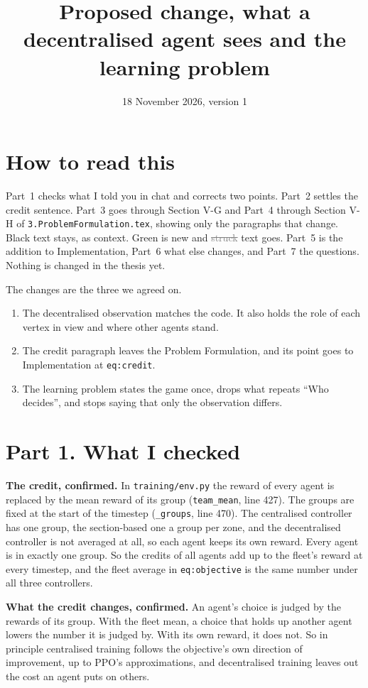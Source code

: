 \documentclass[11pt,a4paper]{article}
\title{Proposed change, what a decentralised agent sees and the learning problem}
\date{18 November 2026, version 1}
\newcommand{\new}[1]{\textcolor{newc}{#1}}
\newcommand{\old}[1]{\textcolor{gray}{\sout{#1}}}
\begin{document}
\sloppy
\maketitle

\section*{How to read this}
Part~1 checks what I told you in chat and corrects two points. Part~2
settles the credit sentence. Part~3 goes through Section V-G and Part~4
through Section V-H of \texttt{3.ProblemFormulation.tex}, showing only the
paragraphs that change. Black text stays, as context. \new{Green} is new
and \old{struck} text goes. Part~5 is the addition to Implementation, Part~6
what else changes, and Part~7 the questions. Nothing is changed in the
thesis yet.

The changes are the three we agreed on.
\begin{enumerate}[nosep]
  \item The decentralised observation matches the code. It also holds the
        role of each vertex in view and where other agents stand.
  \item The credit paragraph leaves the Problem Formulation, and its point
        goes to Implementation at \texttt{eq:credit}.
  \item The learning problem states the game once, drops what repeats
        ``Who decides'', and stops saying that only the observation differs.
\end{enumerate}

\section*{Part 1. What I checked}

\textbf{The credit, confirmed.} In \texttt{training/env.py} the reward of
every agent is replaced by the mean reward of its group
(\texttt{team\_mean}, line 427). The groups are fixed at the start of the
timestep (\texttt{\_groups}, line 470). The centralised controller has one
group, the section-based one a group per zone, and the decentralised
controller is not averaged at all, so each agent keeps its own reward. Every
agent is in exactly one group. So the credits of all agents add up to the
fleet's reward at every timestep, and the fleet average in
\texttt{eq:objective} is the same number under all three controllers.

\textbf{What the credit changes, confirmed.} An agent's choice is judged by
the rewards of its group. With the fleet mean, a choice that holds up
another agent lowers the number it is judged by. With its own reward, it
does not. So in principle centralised training follows the objective's own
direction of improvement, up to PPO's approximations, and decentralised
training leaves out the cost an agent puts on others.
\end{document}
